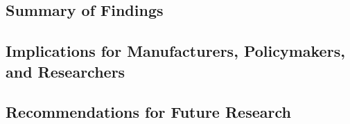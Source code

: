 \subsection{Summary of Findings}\label{subsec:summary-of-findings}
\subsection{Implications for Manufacturers, Policymakers, and Researchers}\label{subsec:implications-for-manufacturers-policymakers-and-researchers}
\subsection{Recommendations for Future Research}\label{subsec:recommendations-for-future-research}
